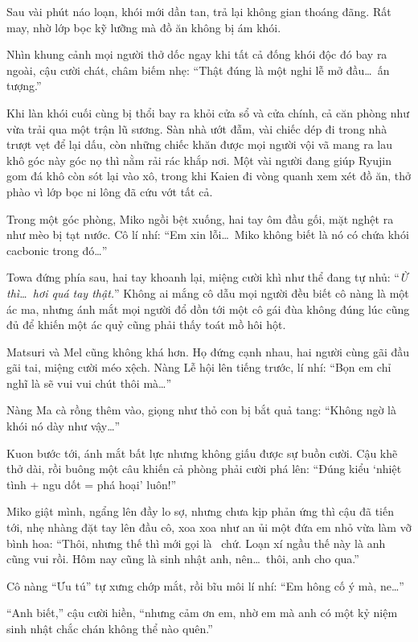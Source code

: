 \documentclass[../main.tex]{subfiles}
\begin{document}
\ct

Sau vài phút náo loạn, khói mới dần tan, trả lại không gian thoáng đãng. Rất may, nhờ lớp bọc kỹ lưỡng mà đồ ăn không bị ám khói.

Nhìn khung cảnh mọi người thở dốc ngay khi tất cả đống khói độc đó bay ra ngoài, cậu cười chát, châm biếm nhẹ: ``Thật đúng là một nghi lễ mở đầu\dots\ ấn tượng.''

Khi làn khói cuối cùng bị thổi bay ra khỏi cửa sổ và cửa chính, cả căn phòng như vừa trải qua một trận lũ sương. Sàn nhà ướt đẫm, vài chiếc dép đi trong nhà trượt vẹt để lại dấu, còn những chiếc khăn được mọi người vội vã mang ra lau khô góc này góc nọ thì nằm rải rác khắp nơi. Một vài người đang giúp Ryujin gom đá khô còn sót lại vào xô, trong khi Kaien đi vòng quanh xem xét đồ ăn, thở phào vì lớp bọc ni lông đã cứu vớt tất cả.

Trong một góc phòng, Miko ngồi bệt xuống, hai tay ôm đầu gối, mặt nghệt ra như mèo bị tạt nước. Cô lí nhí: ``Em xin lỗi\dots\ Miko không biết là nó có chứa khói cacbonic trong đó\dots''

Towa đứng phía sau, hai tay khoanh lại, miệng cười khì như thể đang tự nhủ: ``\textit{Ừ thì\dots\ hơi quá tay thật.}'' Không ai mắng cô dẫu mọi người đều biết cô nàng là một ác ma, nhưng ánh mắt mọi người đổ dồn tới một cô gái đùa không đúng lúc cũng đủ để khiến một ác quỷ cũng phải thấy toát mồ hôi hột.

Matsuri và Mel cũng không khá hơn. Họ đứng cạnh nhau, hai người cùng gãi đầu gãi tai, miệng cười méo xệch. Nàng Lễ hội lên tiếng trước, lí nhí: ``Bọn em chỉ nghĩ là sẽ vui vui chút thôi mà\dots''

Nàng Ma cà rồng thêm vào, giọng như thỏ con bị bắt quả tang: ``Không ngờ là khói nó dày như vậy\dots''

Kuon bước tới, ánh mắt bất lực nhưng không giấu được sự buồn cười. Cậu khẽ thở dài, rồi buông một câu khiến cả phòng phải cười phá lên: ``Đúng kiểu `nhiệt tình + ngu dốt = phá hoại' luôn!''

Miko giật mình, ngẩng lên đầy lo sợ, nhưng chưa kịp phản ứng thì cậu đã tiến tới, nhẹ nhàng đặt tay lên đầu cô, xoa xoa như an ủi một đứa em nhỏ vừa làm vỡ bình hoa: ``Thôi, nhưng thế thì mới gọi là \hll\ chứ. Loạn xí ngầu thế này là anh cũng vui rồi. Hôm nay cũng là sinh nhật anh, nên\dots\ thôi, anh cho qua.''

Cô nàng ``Ưu tú'' tự xưng chớp mắt, rồi bĩu môi lí nhí: ``Em hông cố ý mà, ne\dots''

``Anh biết,'' cậu cười hiền, ``nhưng cảm ơn em, nhờ em mà anh có một kỷ niệm sinh nhật chắc chán không thể nào quên.''
\end{document}
